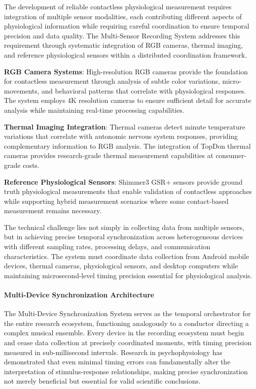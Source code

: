 \documentclass[11pt,a4paper]{article}
\begin{document}
The development of reliable contactless physiological measurement requires
integration of multiple sensor
modalities, each contributing different aspects of physiological information while
requiring careful coordination to
ensure temporal precision and data quality.  The Multi-Sensor Recording System
addresses this requirement through
systematic integration of RGB cameras, thermal imaging, and reference physiological
sensors within a distributed
coordination framework.

\textbf{RGB Camera Systems}: High-resolution RGB cameras provide the foundation for contactless measurement through analysis
of subtle color variations, micro-movements, and behavioral patterns that correlate
with physiological responses.  The
system employs 4K resolution cameras to ensure sufficient detail for accurate
analysis while maintaining real-time
processing capabilities.

\textbf{Thermal Imaging Integration}: Thermal cameras detect minute temperature variations that correlate with autonomic
nervous system responses, providing complementary information to RGB analysis.  The
integration of TopDon thermal cameras
provides research-grade thermal measurement capabilities at consumer-grade costs.

\textbf{Reference Physiological Sensors}: Shimmer3 GSR+ sensors provide ground truth physiological measurements that enable
validation of contactless approaches while supporting hybrid measurement scenarios
where some contact-based measurement
remains necessary.

The technical challenge lies not simply in collecting data from multiple sensors, but
in achieving precise temporal
synchronization across heterogeneous devices with different sampling rates,
processing delays, and communication
characteristics.  The system must coordinate data collection from Android mobile
devices, thermal cameras, physiological
sensors, and desktop computers while maintaining microsecond-level timing precision
essential for physiological
analysis.

\paragraph{Multi-Device Synchronization Architecture}

The Multi-Device Synchronization System serves as the temporal orchestrator for the
entire research ecosystem,
functioning analogously to a conductor directing a complex musical ensemble.  Every
device in the recording ecosystem
must begin and cease data collection at precisely coordinated moments, with timing
precision measured in sub-millisecond
intervals.  Research in psychophysiology has demonstrated that even minimal timing
errors can fundamentally alter the
interpretation of stimulus-response relationships, making precise synchronization not
merely beneficial but essential
for valid scientific conclusions.
\end{document}
